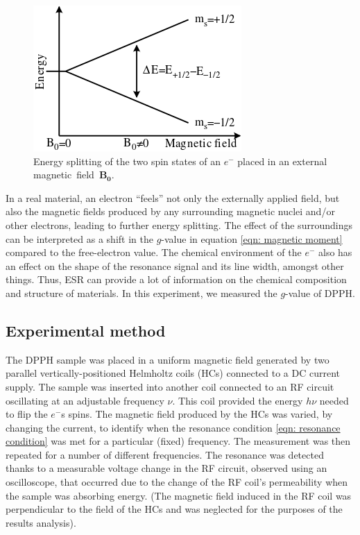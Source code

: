 \documentclass[a4paper]{jpconf}
\numberwithin{equation}{section}
\begin{document}
\begin{figure}[htbp]
	\includegraphics{EPR_splitting.png}
	\caption{Energy splitting of the two spin states of an $e^-$ placed in an external magnetic~field~$\mathbf{B_0}$.}
	\label{fig: energy splitting}
\end{figure}

In a real material, an electron ``feels'' not only the externally applied field, but also the magnetic fields produced by any surrounding magnetic nuclei and/or other electrons, leading to further energy splitting. The effect of the surroundings can be interpreted as a shift in the $g$-value in equation \eqref{eqn: magnetic moment} compared to the free-electron value. The chemical environment of the $e^-$ also has an effect on the shape of the resonance signal and its line width, amongst other things. Thus, ESR can provide a lot of information on the chemical composition and structure of materials. In this experiment, we measured the $g$-value of DPPH.

\subsection{Experimental method}
The DPPH sample was placed in a uniform magnetic field generated by two parallel vertically-positioned Helmholtz coils (HCs) connected to a DC current supply. The sample was inserted into another coil connected to an RF circuit oscillating at an adjustable frequency $\nu$. This coil provided the energy $h\nu$ needed to flip the $e^-$s spins. The magnetic field produced by the HCs was varied, by changing the current, to identify when the resonance condition \eqref{eqn: resonance condition} was met for a particular (fixed) frequency. The measurement was then repeated for a number of different frequencies. The resonance was detected thanks to a measurable voltage change in the RF circuit, observed using an oscilloscope, that occurred due to the change of the RF coil's permeability when the sample was absorbing energy. (The magnetic field induced in the RF coil was perpendicular to the field of the HCs and was neglected for the purposes of the results analysis).
\end{document}

